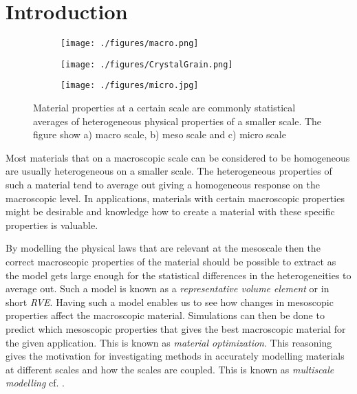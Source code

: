 \documentclass[introduction.tex]{subfiles}
\begin{document}
\chapter{Introduction}



 \begin{figure}
\centering

\begin{subfigure}{.1\textwidth}
  \centering
  \texttt{[image: ./figures/macro.png]}
  \caption{}
  \label{fig:macro}
\end{subfigure}
\scalebox{1.5}{$\boldsymbol{\longleftarrow}$}
\begin{subfigure}{.33\textwidth}
  \centering
  \texttt{[image: ./figures/CrystalGrain.png]}
  \caption{}
  \label{fig:meso}
\end{subfigure}%
\scalebox{1.5}{$\boldsymbol{\longleftarrow}$}
\begin{subfigure}{.33\textwidth}
  \centering
  \texttt{[image: ./figures/micro.jpg]}
  \caption{}
  \label{fig:micro}
\end{subfigure}
\caption{Material properties at a certain scale are commonly statistical averages of heterogeneous physical properties of a smaller scale. The figure show a) macro scale, b) meso scale\cite{wiki:grain} and c) micro scale\cite{Ozawa:ko5009}}
\label{micmacmes}
\end{figure}


Most materials that on a macroscopic scale can be considered to be homogeneous are usually heterogeneous on a smaller scale. The heterogeneous properties of such a material tend to average out giving a homogeneous response on the macroscopic level. In applications, materials with certain macroscopic properties might be desirable and knowledge how to create a material with these specific properties is valuable. 

By modelling the physical laws that are relevant at the mesoscale then the correct macroscopic properties of the material should be possible to extract as the model gets large enough for the statistical differences in the heterogeneities to average out. Such a model is known as a \textit{representative volume element} or in short \textit{RVE}. Having such a model enables us to see how changes in mesoscopic properties affect the macroscopic material. Simulations can then be done to predict which mesoscopic properties that gives the best macroscopic material for the given application. This is known as \textit{material optimization}. This reasoning gives the motivation for investigating methods in accurately modelling materials at different scales and how the scales are coupled. This is known as \textit{multiscale modelling} cf. \cite{zohdi}.
\end{document}
